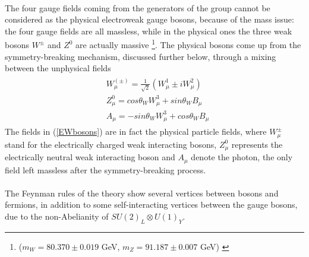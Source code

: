 \\
The four gauge fields coming from the generators of the group cannot be considered as the physical electroweak gauge bosons, because of the mass issue: the four gauge fields are all massless, while in the physical ones the three weak bosons $W^{\pm}$ and $Z^0$ are actually massive
\footnote{($m_W = 80.370 \pm 0.019$ GeV, $m_Z = 91.187 \pm 0.007$ GeV) \cite{Aaboud_2018, Arnaudon}}\cite{altarelli2000standard}.
The physical bosons come up from the symmetry-breaking mechanism, discussed further below, through a mixing between the unphysical fields
\begin{align}
\begin{split}
&W_{\mu}^{(\pm)} = \frac{1}{\sqrt{2}}(W_{\mu}^1 \pm iW_{\mu}^2) \\
&Z_{\mu}^0 = cos\theta_W W_{\mu}^3 + sin\theta_W B_{\mu} \\
&A_{\mu} = -sin\theta_W W_{\mu}^3 + cos\theta_W B_{\mu} 
\end{split}
\label{EWbosons}
\end{align}
The fields in (\ref{EWbosons}) are in fact the physical particle fields, where $W_{\mu}^{\pm}$ stand for the electrically charged weak interacting bosons, $Z_{\mu}^0$ represents the electrically neutral weak interacting boson and $A_{\mu}$ denote the photon, the only field left massless after the symmetry-breaking process\cite{Weinberg:1996kr}.
\\ \\
The Feynman rules of the theory show several vertices between bosons and fermions, in addition to some self-interacting vertices between the gauge bosons, due to the non-Abelianity of \mbox{$SU(2)_L \otimes U(1)_Y$}.

